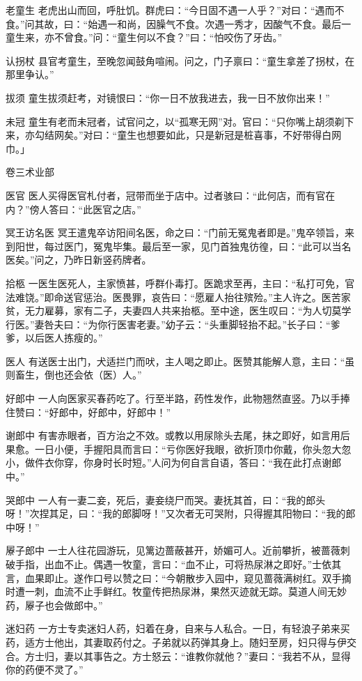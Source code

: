 \documentclass[12pt,UTF8]{ctexbook}
\begin{document}
老童生
老虎出山而回，呼肚饥。群虎曰：“今日固不遇一人乎？”对曰：“遇而不食。”问其故，曰：“始遇一和尚，因臊气不食。次遇一秀才，因酸气不食。最后一童生来，亦不曾食。”问：“童生何以不食？”曰：“怕咬伤了牙齿。”

认拐杖
县官考童生，至晚忽闻鼓角喧闹。问之，门子禀曰：“童生拿差了拐杖，在那里争认。”

拔须
童生拔须赶考，对镜恨曰：“你一日不放我进去，我一日不放你出来！”

未冠
童生有老而未冠者，试官问之，以“孤寒无网”对。官曰：“只你嘴上胡须剃下来，亦勾结网矣。”对曰：“童生也想要如此，只是新冠是桩喜事，不好带得白网巾。」

卷三术业部

医官
医人买得医官札付者，冠带而坐于店中。过者骇曰：“此何店，而有官在内？”傍人答曰：“此医官之店。”

冥王访名医
冥王遣鬼卒访阳间名医，命之曰：“门前无冤鬼者即是。”鬼卒领旨，来到阳世，每过医门，冤鬼毕集。最后至一家，见门首独鬼彷徨，曰：“此可以当名医矣。”问之，乃昨日新竖药牌者。

拾柩
一医生医死人，主家愤甚，呼群仆毒打。医跪求至再，主曰：“私打可免，官法难饶。”即命送官惩治。医畏罪，哀告曰：“愿雇人抬往殡殓。”主人许之。医苦家贫，无力雇募，家有二子，夫妻四人共来抬柩。至中途，医生叹曰：“为人切莫学行医。”妻咎夫曰：“为你行医害老妻。”幼子云：“头重脚轻抬不起。”长子曰：“爹爹，以后医人拣瘦的。”

医人
有送医士出门，犬适拦门而吠，主人喝之即止。医赞其能解人意，主曰：“虽则畜生，倒也还会依（医）人。”

好郎中
一人向医家买春药吃了。行至半路，药性发作，此物翘然直竖。乃以手捧住赞曰：“好郎中，好郎中，好郎中！”

谢郎中
有害赤眼者，百方治之不效。或教以用尿除头去尾，抹之即好，如言用后果愈。一日小便，手握阳具而言曰：“亏你医好我眼，欲折顶巾你戴，你头忽大忽小，做件衣你穿，你身时长时短。”人问为何自言自语，答曰：“我在此打点谢郎中。”

哭郎中
一人有一妻二妾，死后，妻妾绕尸而哭。妻抚其首，曰：“我的郎头呀！”次捏其足，曰：“我的郎脚呀！”又次者无可哭附，只得握其阳物曰：“我的郎中呀！”

屪子郎中
一士人往花园游玩，见篱边蔷蔽甚开，娇媚可人。近前攀折，被蔷薇刺破手指，出血不止。偶遇一牧童，言曰：“血不止，可将热尿淋之即好。”士依其言，血果即止。遂作口号以赞之曰：“今朝散步入园中，窥见蔷薇满树红。双手摘时遭一刺，血流不止手鲜红。牧童传把热尿淋，果然灭迹就无踪。莫道人间无妙药，屪子也会做郎中。”

迷妇药
一方士专卖迷妇人药，妇着在身，自来与人私合。一日，有轻浪子弟来买药，适方士他出，其妻取药付之。子弟就以药弹其身上。随妇至房，妇只得与伊交合。方士归，妻以其事告之。方士怒云：“谁教你就他？”妻曰：“我若不从，显得你的药便不灵了。”
\end{document}
